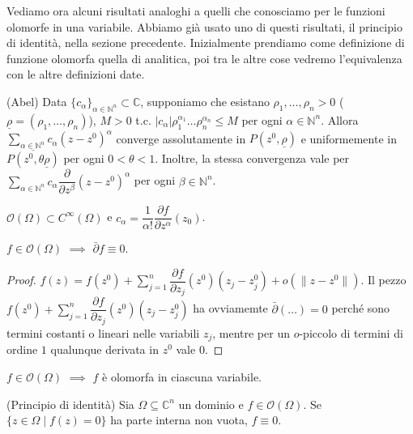 Vediamo ora alcuni risultati analoghi a quelli che conosciamo per le funzioni olomorfe in una variabile. Abbiamo già usato uno di questi risultati, il principio di identità, nella sezione precedente. Inizialmente prendiamo come definizione di funzione olomorfa quella di analitica, poi tra le altre cose vedremo l'equivalenza con le altre definizioni date.

\begin{lm}
  (Abel) Data $\{c_{\alpha}\}_{\alpha \in \mathbb{N}^n} \subset \mathbb{C}$, supponiamo che esistano $\rho_1, \dots, \rho_n>0$ ($\underline{\rho}=(\rho_1, \dots, \rho_n)$), $M>0$ t.c. $|c_{\alpha}|\rho_1^{\alpha_1}\dots\rho_n^{\alpha_n} \le M$ per ogni $\alpha \in \mathbb{N}^n$.
  Allora $\displaystyle \sum_{\alpha \in \mathbb{N}^n} c_{\alpha}(z-z^0)^{\alpha}$ converge assolutamente in $P(z^0, \underline{\rho})$ e uniformemente in $\overline{P(z^0, \theta\underline{\rho})}$ per ogni $0<\theta<1$.
  Inoltre, la stessa convergenza vale per $\displaystyle \sum_{\alpha \in \mathbb{N}^n} c_{\alpha} \dfrac{\partial}{\partial z^\beta}(z-z^0)^\alpha$ per ogni $\beta \in \mathbb{N}^n$.
\end{lm}

\begin{cor} \label{coeff_anal_multi}
  $\mathcal{O}(\Omega) \subset C^\infty(\Omega)$ e $c_\alpha=\dfrac{1}{\alpha!}\dfrac{\partial f}{\partial z^\alpha}(z_0)$.
\end{cor}

\begin{cor}
  $f \in \mathcal{O}(\Omega)$ $\implies$ $\bar{\partial}f \equiv 0$.
\end{cor}

\begin{proof}
  $\displaystyle f(z)=f(z^0)+\sum_{j=1}^n \dfrac{\partial f}{\partial z_j}(z^0)(z_j-z_j^0)+o(\|z-z^0\|)$. Il pezzo $\displaystyle f(z^0)+\sum_{j=1}^n \dfrac{\partial f}{\partial z_j}(z^0)(z_j-z_j^0)$ ha ovviamemte $\bar{\partial}(\dots)=0$ perché sono termini costanti o lineari nelle variabili $z_j$, mentre per un $o$-piccolo di termini di ordine $1$ qualunque derivata in $z^0$ vale $0$.
\end{proof}

\begin{cor} \label{olo_var}
  $f \in \mathcal{O}(\Omega)$ $\implies$ $f$ è olomorfa in ciascuna variabile.
\end{cor}

\begin{prop}
  (Principio di identità) Sia $\Omega \subseteq \mathbb{C}^n$ un dominio e $f \in \mathcal{O}(\Omega)$. Se $\{z \in \Omega \mid f(z)=0\}$ ha parte interna non vuota, $f \equiv 0$.
\end{prop}

